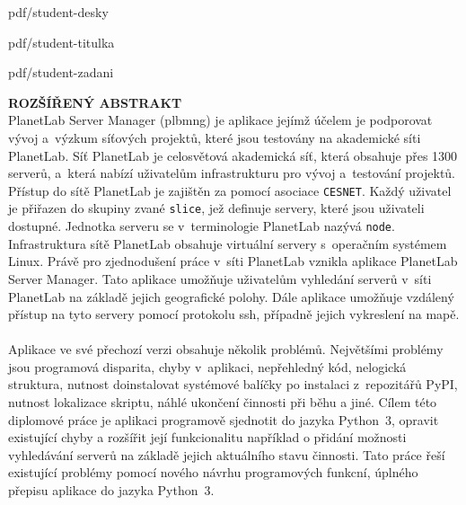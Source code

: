 \documentclass[%
  12pt,       				%
  a4paper,    				%
	unicode,						%
]{report}				    	%
\begin{document}
\pagestyle{empty} %

%
  {pdf/student-desky}%
\setcounter{page}{1} %

%
  {pdf/student-titulka}%
   
%
  {pdf/student-zadani}%

\vytvorabstrakt

\cleardoublepage
\noindent
{\large\sffamily\bfseries\MakeUppercase{Rozšířený abstrakt}}
\\
PlanetLab Server Manager (plbmng) je aplikace jejímž účelem je podporovat vývoj a~výzkum síťových projektů, které jsou testovány na akademické síti PlanetLab. Síť PlanetLab je celosvětová akademická síť, která obsahuje přes 1300 serverů, a~která nabízí uživatelům infrastrukturu pro vývoj a~testování projektů. Přístup do sítě PlanetLab je zajištěn za pomocí asociace \texttt{CESNET}. Každý uživatel je přiřazen do skupiny zvané \texttt{slice}, jež definuje servery, které jsou uživateli dostupné. Jednotka serveru se v~terminologie PlanetLab nazývá \texttt{node}. Infrastruktura sítě PlanetLab obsahuje virtuální servery s~operačním systémem Linux. Právě pro zjednodušení práce v~síti PlanetLab vznikla aplikace PlanetLab Server Manager. Tato aplikace umožňuje uživatelům vyhledání serverů v~síti PlanetLab na základě jejich geografické polohy. Dále aplikace umožňuje vzdálený přístup na tyto servery pomocí protokolu ssh, případně jejich vykreslení na mapě.
\paragraph{} Aplikace ve své přechozí verzi obsahuje několik problémů. Největšími problémy jsou programová disparita, chyby v~aplikaci, nepřehledný kód, nelogická struktura, nutnost doinstalovat systémové balíčky po instalaci z~repozitářů PyPI, nutnost lokalizace skriptu, náhlé ukončení činnosti při běhu a jiné. Cílem této diplomové práce je aplikaci programově sjednotit do jazyka Python~3, opravit existující chyby a rozšířit její funkcionalitu například o přidání možnosti vyhledávání serverů na základě jejich aktuálního stavu činnosti. Tato práce řeší existující problémy pomocí nového návrhu programových funkcní, úplného přepisu aplikace do jazyka Python~3.
\end{document}
